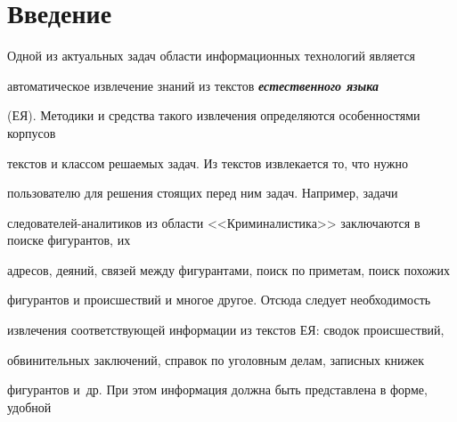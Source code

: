 












      \thispagestyle{headings}





      


            \label{st\stat}


            


            \vspace*{-9pt}








\section*{Введение}





Одной из актуальных задач области информационных технологий является 


автоматическое извлечение знаний из текстов {\bfseries\textit{естественного языка}} 


(ЕЯ). Методики и средства такого извлечения определяются особенностями корпусов 


текстов и классом решаемых задач. Из текстов извлекается то, что нужно 


пользователю для решения стоящих перед ним задач. Например, задачи 


следователей-ана\-ли\-ти\-ков из области <<Криминалистика>> заключаются в поиске фигурантов, их 


адресов, деяний, связей между фигурантами, поиск по приметам, поиск похожих 


фигурантов и происшествий и многое другое. Отсюда следует необходимость 


извлечения соответствующей информации из текстов ЕЯ: сводок происшествий, 


обвинительных заключений, справок по уголовным делам, записных книжек 


фигурантов и~др. При этом информация должна быть представлена в форме, удобной 


